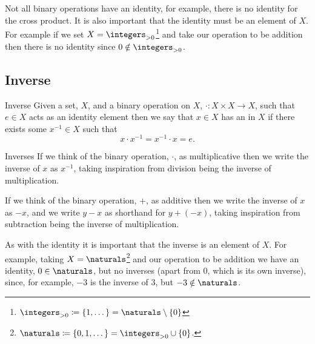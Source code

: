 \documentclass[fleqn]{NotesClass}
\newcommand*{\union}{\cup}
\newcommand*{\positiveintegers}{\integers_{>0}}
\begin{document}
    Not all binary operations have an identity, for example, there is no identity for the cross product.
    It is also important that the identity must be an element of \(X\).
    For example if we set \(X = \positiveintegers\)\footnote{\(\positiveintegers \coloneqq \{1, \dotsc\} = \naturals \setminus \{0\}\)} and take our operation to be addition then there is no identity since \(0 \notin \positiveintegers\).
    
    \subsection{Inverse}
    \begin{dfn}{Inverse}{}
        Given a set, \(X\), and a binary operation on \(X\), \(\cdot \colon X \times X \to X\), such that \(e \in X\) acts as an identity element then we say that \(x \in X\) has an  in \(X\) if there exists some \(x^{-1} \in X\) such that
        \begin{equation}
            x \cdot x^{-1} = x^{-1} \cdot x = e.
        \end{equation}
    \end{dfn}
    
    \begin{ntn}{Inverses}{}
        If we think of the binary operation, \(\cdot\), as multiplicative then we write the inverse of \(x\) as \(x^{-1}\), taking inspiration from division being the inverse of multiplication.
        
        If we think of the binary operation, \(+\), as additive then we write the inverse of \(x\) as \(-x\), and we write \(y - x\) as shorthand for \(y + (-x)\), taking inspiration from subtraction being the inverse of multiplication.
    \end{ntn}
    
    As with the identity it is important that the inverse is an element of \(X\).
    For example, taking \(X = \naturals\)\footnote{\(\naturals \coloneqq \{0, 1, \dotsc\} = \positiveintegers \union \{0\}\).} and our operation to be addition we have an identity, \(0 \in \naturals\), but no inverses (apart from 0, which is its own inverse), since, for example, \(-3\) is the inverse of \(3\), but \(-3 \notin \naturals\).
    
\end{document}
